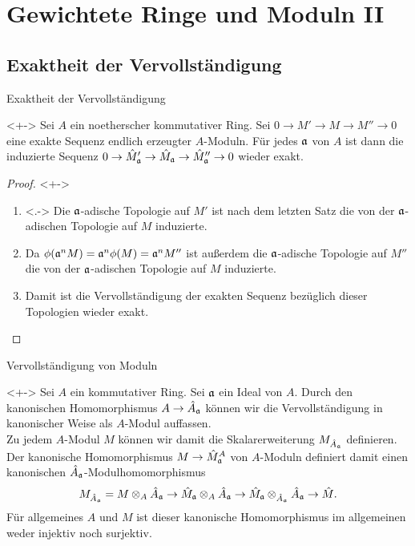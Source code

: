 \section{Gewichtete Ringe und Moduln II}

\subsection{Exaktheit der Vervollständigung}

\begin{frame}{Exaktheit der Vervollständigung}
	\begin{proposition}<+->
		Sei \(A\) ein noetherscher kommutativer Ring. Sei \(0 \to M' \to M \to
		M'' \to 0\) eine exakte Sequenz endlich erzeugter \(A\)-Moduln.
		Für jedes \(\mathfrak{a}\) von \(A\) ist dann die induzierte Sequenz
		\(0 \to \hat M'_{\mathfrak{a}} \to \hat M_{\mathfrak{a}} \to \hat M''_{\mathfrak{a}}
		\to 0\) wieder exakt.
	\end{proposition}
	\begin{proof}<+->
		\begin{enumerate}[<+->]
		\item<.->
			Die \(\mathfrak{a}\)-adische Topologie auf \(M'\) ist nach dem 
			letzten Satz die von
			der \(\mathfrak{a}\)-adischen Topologie auf \(M\) induzierte. 
		\item
			Da \(\phi(\mathfrak{a}^n M) = \mathfrak{a}^n \phi(M) = \mathfrak{a}^n M''\)
			ist außerdem die \(\mathfrak{a}\)-adische Topologie auf \(M''\) die
			von der \(\mathfrak{a}\)-adischen Topologie auf \(M\) induzierte.
		\item
			Damit ist die Vervollständigung der exakten Sequenz bezüglich dieser
			Topologien wieder exakt.
			\qedhere
		\end{enumerate}
	\end{proof}
\end{frame}

\begin{frame}{Vervollständigung von Moduln}
	\begin{remark}<+->
		Sei \(A\) ein kommutativer Ring. Sei \(\mathfrak{a}\) ein
		Ideal von \(A\). Durch den kanonischen Homomorphismus \(A \to \hat A_{\mathfrak{a}}\)
		können wir die Vervollständigung in kanonischer Weise als \(A\)-Modul
		auffassen.
		\\
		Zu jedem \(A\)-Modul \(M\) können wir damit die Skalarerweiterung
		\(M_{\hat A_{\mathfrak{a}}}\) definieren. Der kanonische Homomorphismus
		\(M \to \hat M_{\mathfrak{a}}^A\) von \(A\)-Moduln definiert damit einen
		kanonischen \(\hat A_{\mathfrak{a}}\)-Modulhomomorphismus
		\[
			M_{\hat A_{\mathfrak{a}}}
			= M \otimes_A \hat A_{\mathfrak{a}} \to \hat M_{\mathfrak{a}} \otimes_A
			\hat A_{\mathfrak{a}} \to \hat M_{\mathfrak{a}} \otimes_{\hat A_{\mathfrak{a}}}
			\hat A_{\mathfrak{a}} \to \hat M.
		\]
		Für allgemeines \(A\) und \(M\) ist dieser kanonische Homomorphismus
		im allgemeinen weder injektiv noch surjektiv.
	\end{remark}
\end{frame}

